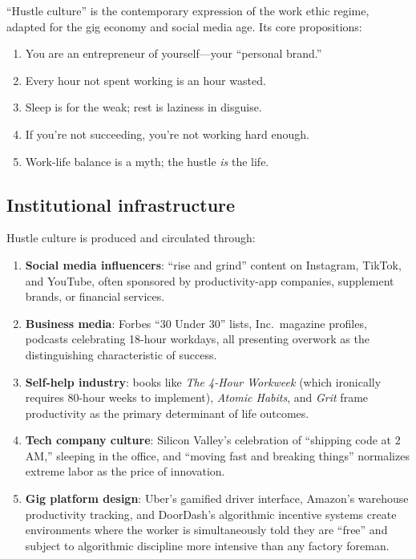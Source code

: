 ``Hustle culture'' is the contemporary expression of the work ethic regime, adapted for the gig economy and social media age.
Its core propositions:
\begin{enumerate}[nosep]
  \item You are an entrepreneur of yourself---your ``personal brand.''
  \item Every hour not spent working is an hour wasted.
  \item Sleep is for the weak; rest is laziness in disguise.
  \item If you're not succeeding, you're not working hard enough.
  \item Work-life balance is a myth; the hustle \emph{is} the life.
\end{enumerate}

\subsection{Institutional infrastructure}

Hustle culture is produced and circulated through:

\begin{enumerate}
  \item \textbf{Social media influencers}: ``rise and grind'' content on Instagram, TikTok, and YouTube, often sponsored by productivity-app companies, supplement brands, or financial services.

  \item \textbf{Business media}: Forbes ``30 Under 30'' lists, Inc.\ magazine profiles, podcasts celebrating 18-hour workdays, all presenting overwork as the distinguishing characteristic of success.

  \item \textbf{Self-help industry}: books like \emph{The 4-Hour Workweek} (which ironically requires 80-hour weeks to implement), \emph{Atomic Habits}, and \emph{Grit} frame productivity as the primary determinant of life outcomes.

  \item \textbf{Tech company culture}: Silicon Valley's celebration of ``shipping code at 2 AM,'' sleeping in the office, and ``moving fast and breaking things'' normalizes extreme labor as the price of innovation.

  \item \textbf{Gig platform design}: Uber's gamified driver interface, Amazon's warehouse productivity tracking, and DoorDash's algorithmic incentive systems create environments where the worker is simultaneously told they are ``free'' and subject to algorithmic discipline more intensive than any factory foreman.
\end{enumerate}

